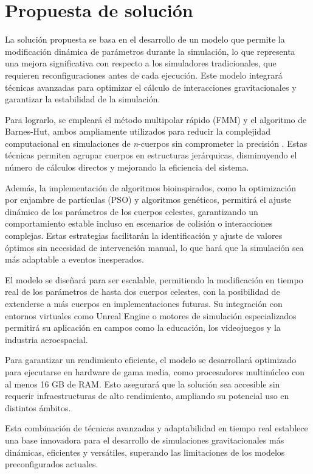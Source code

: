 \section{Propuesta de solución}

La solución propuesta se basa en el desarrollo de un modelo que permite la modificación dinámica de parámetros durante la simulación, lo que representa una mejora significativa con respecto a los simuladores tradicionales, que requieren reconfiguraciones antes de cada ejecución. Este modelo integrará técnicas avanzadas para optimizar el cálculo de interacciones gravitacionales y garantizar la estabilidad de la simulación.

Para lograrlo, se empleará el método multipolar rápido (FMM) y el algoritmo de Barnes-Hut, ambos ampliamente utilizados para reducir la complejidad computacional en simulaciones de \textit{n}-cuerpos sin comprometer la precisión . Estas técnicas permiten agrupar cuerpos en estructuras jerárquicas, disminuyendo el número de cálculos directos y mejorando la eficiencia del sistema.

Además, la implementación de algoritmos bioinspirados, como la optimización por enjambre de partículas (PSO) y algoritmos genéticos, permitirá el ajuste dinámico de los parámetros de los cuerpos celestes, garantizando un comportamiento estable incluso en escenarios de colisión o interacciones complejas. Estas estrategias facilitarán la identificación y ajuste de valores óptimos sin necesidad de intervención manual, lo que hará que la simulación sea más adaptable a eventos inesperados.

El modelo se diseñará para ser escalable, permitiendo la modificación en tiempo real de los parámetros de hasta dos cuerpos celestes, con la posibilidad de extenderse a más cuerpos en implementaciones futuras. Su integración con entornos virtuales como Unreal Engine o motores de simulación especializados permitirá su aplicación en campos como la educación, los videojuegos y la industria aeroespacial.

Para garantizar un rendimiento eficiente, el modelo se desarrollará optimizado para ejecutarse en hardware de gama media, como procesadores multinúcleo con al menos 16 GB de RAM. Esto asegurará que la solución sea accesible sin requerir infraestructuras de alto rendimiento, ampliando su potencial uso en distintos ámbitos.

Esta combinación de técnicas avanzadas y adaptabilidad en tiempo real establece una base innovadora para el desarrollo de simulaciones gravitacionales más dinámicas, eficientes y versátiles, superando las limitaciones de los modelos preconfigurados actuales.